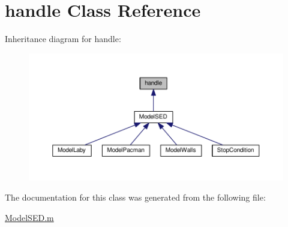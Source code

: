 \hypertarget{classhandle}{}\section{handle Class Reference}
\label{classhandle}


Inheritance diagram for handle\+:
\nopagebreak
\begin{figure}[H]
\begin{center}
\leavevmode
\includegraphics[width=350pt]{classhandle__inherit__graph}
\end{center}
\end{figure}


The documentation for this class was generated from the following file\+:\begin{DoxyCompactItemize}
\item 
\hyperlink{_model_s_e_d_8m}{Model\+S\+E\+D.\+m}\end{DoxyCompactItemize}
